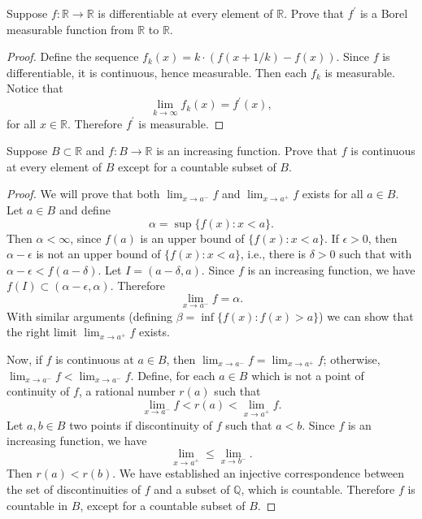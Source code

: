 \documentclass[14.5pt]{article}
\newcommand{\Q}{\mathbb{Q}}
\newcommand{\R}{\mathbb{R}}
\newenvironment{problem}[2][Problem]{\begin{mdframed}[backgroundcolor=gray!10, leftline = false, rightline=false, linewidth=0.25pt]  \begin{trivlist}
\item[\hskip \labelsep {\bfseries #1}\hskip \labelsep {\bfseries #2.}]}{\end{trivlist} \end{mdframed}  }
\begin{document}
\begin{problem}{2B.18}
    Suppose $f : \R \rightarrow \R$ is differentiable at every element of $\R$. Prove that $f^\prime$ is a Borel measurable function from $\R$ to $\R.$
\end{problem}
\begin{proof}
Define the sequence $f_k(x) = k\cdot (f(x + 1/k) - f(x))$. Since $f$ is differentiable, it is continuous, hence measurable. Then each $f_k$ is measurable. Notice that
$$\lim_{k \to \infty} f_k(x) = f^\prime(x),$$
for all $x \in \R.$ Therefore $f^{\prime}$ is measurable.
\end{proof}

\begin{problem}{2B.22}
Suppose $B \subset \R$ and $f : B \rightarrow \R $ is an increasing function. Prove that $f$ is
continuous at every element of $B$ except for a countable subset of $B$.
\end{problem}
\begin{proof}
    We will prove that both $\lim_{x \to a^-} f$ and $\lim_{x \to a^+} f$ exists for all $a \in B$. Let $a \in B$  and define
    $$\alpha = \sup \{f(x): x < a\} .$$
    Then $\alpha < \infty$,  since $f(a)$ is an upper bound of $\{f(x): x < a\}$.
    If $\epsilon > 0$, then $\alpha - \epsilon$ is not an upper bound of $\{f(x): x < a\}$, i.e., there is $\delta > 0$ such that  with $\alpha - \epsilon < f(a - \delta)$. Let $I = (a-\delta, a)$. Since $f$ is an increasing function, we have
    $f(I) \subset (\alpha - \epsilon, \alpha)$. Therefore $$\lim_{x \to a^-} f = \alpha.$$
    With similar arguments (defining $\beta = \inf \{f(x) : f(x) > a\}$) we can show that the right limit $\lim_{x \to a^+} f$ exists. 

    Now, if $f$ is continuous at $a \in B$, then $\lim_{x \to a^-} f = \lim_{x \to a^+} f$; otherwise, $\lim_{x \to a^-} f < \lim_{x \to a^-} f$. Define, for each $a \in B$ which is not a point of continuity of $f$, a rational number $r(a)$ such that 
    $$\lim_{x \to a^-} f < r(a) < \lim_{x \to a^+} f.$$
    Let $a, b \in B$ two points if discontinuity of $f$ such that $a < b$. Since $f$ is an increasing function, we have
    $$\lim_{x \to a^+} \leq \lim_{x \to b^-}.$$ Then $r(a) < r(b).$
    We have established an injective correspondence between the set of discontinuities of $f$ and a subset of $\Q$, which is countable. Therefore $f$ is countable in $B$, except for a countable subset of $B.$ 
\end{proof}
\end{document}
